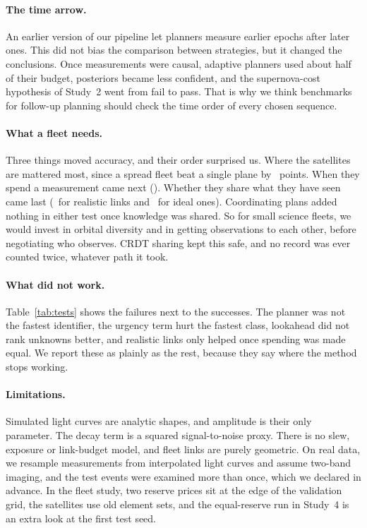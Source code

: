 \documentclass{jaa}
\begin{document}
\paragraph{The time arrow.} An earlier version of our pipeline let planners measure earlier epochs after later ones. This did not bias the comparison between strategies, but it changed the conclusions. Once measurements were causal, adaptive planners used about half of their budget, posteriors became less confident, and the supernova-cost hypothesis of Study~2 went from fail to pass. That is why we think benchmarks for follow-up planning should check the time order of every chosen sequence.

\paragraph{What a fleet needs.} Three things moved accuracy, and their order surprised us. Where the satellites are mattered most, since a spread fleet beat a single plane by \FleetBFourEst\ points. When they spend a measurement came next (\FleetBThreeEst). Whether they share what they have seen came last (\FleetBOneEst\ for realistic links and \FleetHFourOneEst\ for ideal ones). Coordinating plans added nothing in either test once knowledge was shared. So for small science fleets, we would invest in orbital diversity and in getting observations to each other, before negotiating who observes. CRDT sharing kept this safe, and no record was ever counted twice, whatever path it took.

\paragraph{What did not work.} Table~\ref{tab:tests} shows the failures next to the successes. The planner was not the fastest identifier, the urgency term hurt the fastest class, lookahead did not rank unknowns better, and realistic links only helped once spending was made equal. We report these as plainly as the rest, because they say where the method stops working.

\paragraph{Limitations.} Simulated light curves are analytic shapes, and amplitude is their only parameter. The decay term is a squared signal-to-noise proxy. There is no slew, exposure or link-budget model, and fleet links are purely geometric. On real data, we resample measurements from interpolated light curves and assume two-band imaging, and the test events were examined more than once, which we declared in advance. In the fleet study, two reserve prices sit at the edge of the validation grid, the satellites use old element sets, and the equal-reserve run in Study~4 is an extra look at the first test seed.
\end{document}
